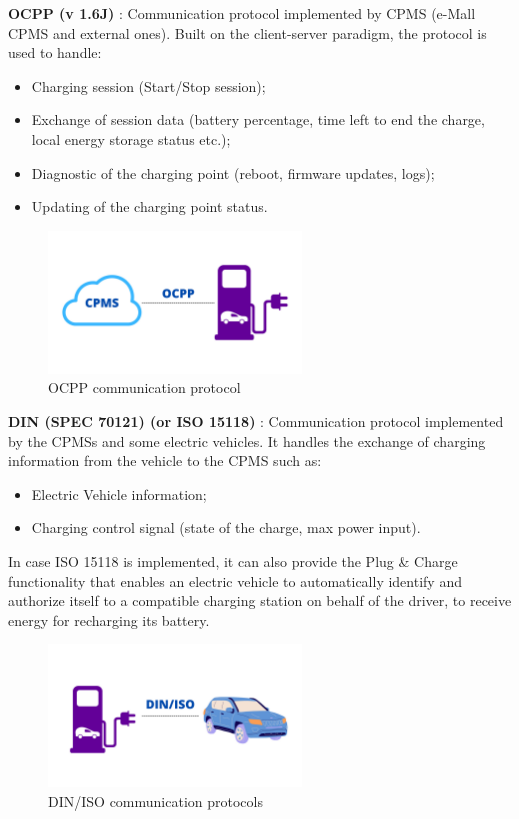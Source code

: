 \documentclass[12pt]{report}
\begin{document}
\textbf{OCPP (v 1.6J)} : Communication protocol implemented by CPMS (e-Mall CPMS and external ones). Built on the client-server paradigm, the protocol is used to handle:
    \begin{itemize}
        \item Charging session (Start/Stop session);
        \item Exchange of session data (battery percentage, time left to end the charge, local energy storage status etc.);
        \item Diagnostic of the charging point (reboot, firmware updates, logs);
        \item Updating of the charging point status.
     \end{itemize}
\begin{figure}[h]
    \centering
    \includegraphics[width = 0.6\textwidth]{assets/OCCP.JPEG}
    \caption{OCPP communication protocol}
\end{figure}
\newpage

\textbf{DIN (SPEC 70121) (or ISO 15118)} : Communication protocol implemented by the CPMSs and some electric vehicles. It handles the exchange of charging information from the vehicle to the CPMS such as:
\begin{itemize}
    \item Electric Vehicle information;
    \item Charging control signal (state of the charge, max power input).
\end{itemize}
In case ISO 15118 is implemented, it can also provide the Plug \& Charge functionality that  enables an electric vehicle to automatically identify and authorize itself to a compatible charging station on behalf of the driver, to receive energy for recharging its battery.
\begin{figure}[h]
    \centering
    \includegraphics[width = 0.6\textwidth]{assets/DIN-ISO.JPEG}
    \caption{DIN/ISO communication protocols}
\end{figure}
\end{document}
